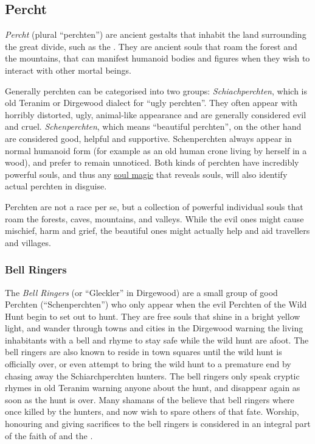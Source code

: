 \subsection{Percht}
\label{sec:Percht}

\emph{Percht} (plural ``perchten'') are ancient gestalts that inhabit the
land surrounding the great divide, such as the . They
are ancient souls that roam the forest and the mountains, that can manifest
humanoid bodies and figures when they wish to interact with other mortal
beings.

Generally perchten can be categorised into two groups: \emph{Schiachperchten},
which is old Teranim or Dirgewood dialect for ``ugly perchten''. They often
appear with horribly distorted, ugly, animal-like appearance and are generally
considered evil and cruel. \emph{Schenperchten}, which means ``beautiful
perchten'', on the other hand are considered good, helpful and
supportive. Schenperchten always appear in normal humanoid form (for example
as an old human crone living by herself in a wood), and prefer to remain
unnoticed. Both kinds of perchten have incredibly powerful souls, and thus
any \hyperref[sec:Soul Magic]{soul magic} that reveals souls, will also
identify actual perchten in disguise.

Perchten are not a race per se, but a collection of powerful individual souls
that roam the forests, caves, mountains, and valleys. While the evil ones might
cause mischief, harm and grief, the beautiful ones might actually help and aid
travellers and villages.

\subsubsection{Bell Ringers}
\label{sec:Bell Ringers}

The \emph{Bell Ringers} (or ``Gleckler'' in Dirgewood) are a small group of
good Perchten (``Schenperchten'') who only appear when the evil Perchten
of the Wild Hunt begin to set out to hunt. They are free souls that shine
in a bright yellow light, and wander through towns and cities in the Dirgewood
warning the living inhabitants with a bell and rhyme to stay safe while
the wild hunt are afoot. The bell ringers are also known to reside in town
squares until the wild hunt is officially over, or even attempt to bring the
wild hunt to a premature end by chasing away the Schiarchperchten hunters. The
bell ringers only speak cryptic rhymes in old Teranim warning anyone about
the hunt, and disappear again as soon as the hunt is over. Many shamans of the
 believe that bell ringers where once killed by the
hunters, and now wish to spare others of that fate. Worship, honouring and
giving sacrifices to the bell ringers is considered in an integral part of the
faith of  and the .

